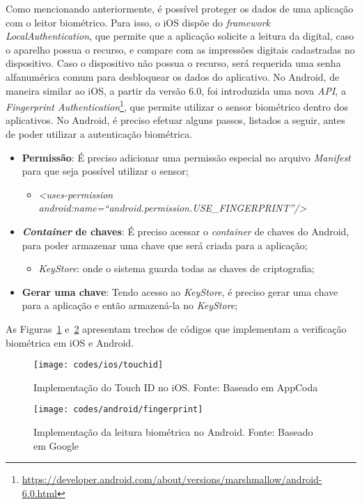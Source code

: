 Como mencionando anteriormente, é possível proteger os dados de uma aplicação com o leitor biométrico. Para isso, o iOS dispõe do \textit{framework LocalAuthentication}, que permite que a aplicação solicite a leitura da 
digital, caso o aparelho possua o recurso, e compare com as impressões digitais cadastradas no dispositivo. Caso o dispositivo não possua o recurso, será requerida uma senha alfanumérica comum para desbloquear os dados do 
aplicativo. No Android, de maneira similar ao iOS, a partir da versão 6.0, foi introduzida uma nova \textit{API}, a \textit{Fingerprint Authentication}\footnote{\url{https://developer.android.com/about/versions/marshmallow/android-6.0.html}}, 
que permite utilizar o sensor biométrico dentro dos aplicativos. No Android, é preciso efetuar alguns passos, listados a seguir, antes de poder utilizar a autenticação biométrica. 

\begin{itemize}
	\item \textbf{Permissão}: É preciso adicionar uma permissão especial no arquivo \textit{Manifest} para que seja possível utilizar o sensor;
	\begin{itemize}
		\item \textit{<uses-permission android:name=``android.permission.USE\_FINGERPRINT''/>} 
	\end{itemize}
	\item \textbf{\textit{Container} de chaves}: É preciso acessar o \textit{container} de chaves do Android, para poder armazenar uma chave que será criada para a aplicação;
	\begin{itemize}
		\item \textit{KeyStore}: onde o sistema guarda todas as chaves de criptografia;
	\end{itemize}
	\item \textbf{Gerar uma chave}: Tendo acesso ao \textit{KeyStore}, é preciso gerar uma chave para a aplicação e então armazená-la no \textit{KeyStore};
\end{itemize}

As Figuras~\ref{fig:touchid-ios} e~\ref{fig:fingerprint-android} apresentam trechos de códigos que implementam a verificação biométrica em iOS e Android.

\begin{figure}[H]
	\centering
	\texttt{[image: codes/ios/touchid]}
	\caption[Implementação do Touch ID no iOS]{Implementação do Touch ID no iOS. Fonte: Baseado em AppCoda\protect\footnotemark}
	\label{fig:touchid-ios}
\end{figure}
\begin{figure}[H]
	\centering
	\texttt{[image: codes/android/fingerprint]}
	\caption[Implementação da leitura biométrica no Android]{Implementação da leitura biométrica no Android. Fonte: Baseado em Google\protect\footnotemark}
	\label{fig:fingerprint-android}
\end{figure}

